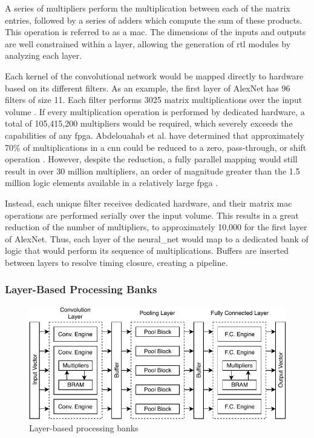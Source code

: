 \documentclass{uw-ece-wkrpt}
\begin{document}
A series of multipliers perform the multiplication between each of the matrix entries, followed by a series of adders which compute the sum of these products. This operation is referred to as a \gls{mac}. The dimensions of the inputs and outputs are well constrained within a layer, allowing the generation of \gls{rtl} modules by analyzing each layer.

Each \gls{kernel} of the convolutional network would be mapped directly to hardware based on its different \glspl{filter}. As an example, the first layer of AlexNet has 96 \glspl{filter} of size 11. Each \gls{filter} performs 3025 matrix multiplications over the input volume \cite{Krizhevsky2017ImageNet-Classi}. If every multiplication operation is performed by dedicated hardware, a total of 105,415,200 multipliers would be required, which severely exceeds the capabilities of any \gls{fpga}. Abdelouahab et al. have determined that approximately 70\% of multiplications in a \gls{cnn} could be reduced to a zero, pass-through, or shift operation \cite{Abdelouahab2017Hardware-Automa}. However, despite the reduction, a fully parallel mapping would still result in over 30 million multipliers, an order of magnitude greater than the 1.5 million logic elements available in a relatively large \gls{fpga} \cite{Intel-Corp.2018IntelR-ArriaR-1}.

Instead, each unique \gls{filter} receives dedicated hardware, and their matrix \gls{mac} operations are performed serially over the input volume. This results in a great reduction of the number of multipliers, to approximately 10,000 for the first layer of AlexNet. Thus, each layer of the \gls{neural_net} would map to a dedicated bank of logic that would perform its sequence of multiplications. Buffers are inserted between layers to resolve timing closure, creating a pipeline.

\subsubsection{Layer-Based Processing Banks}

\begin{figure}
    \centering
    \includegraphics[width=\textwidth]{figures/layer-based_processing}
    \caption{Layer-based processing banks}\label{fig:layer-based_processing}
\end{figure}
\end{document}
